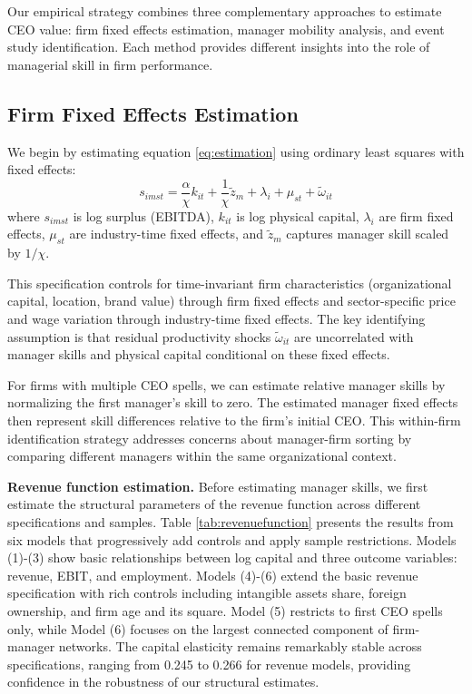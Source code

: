 \documentclass[11pt,a4paper]{article}
\begin{document}
Our empirical strategy combines three complementary approaches to estimate CEO value: firm fixed effects estimation, manager mobility analysis, and event study identification. Each method provides different insights into the role of managerial skill in firm performance.

\subsection{Firm Fixed Effects Estimation}

We begin by estimating equation \eqref{eq:estimation} using ordinary least squares with fixed effects:
\begin{equation}
s_{imst} = \frac{\alpha}{\chi} k_{it} + \frac{1}{\chi}\tilde{z}_m + \lambda_i + \mu_{st} + \tilde{\omega}_{it}
\end{equation}
where $s_{imst}$ is log surplus (EBITDA), $k_{it}$ is log physical capital, $\lambda_i$ are firm fixed effects, $\mu_{st}$ are industry-time fixed effects, and $\tilde{z}_m$ captures manager skill scaled by $1/\chi$.

This specification controls for time-invariant firm characteristics (organizational capital, location, brand value) through firm fixed effects and sector-specific price and wage variation through industry-time fixed effects. The key identifying assumption is that residual productivity shocks $\tilde{\omega}_{it}$ are uncorrelated with manager skills and physical capital conditional on these fixed effects.

For firms with multiple CEO spells, we can estimate relative manager skills by normalizing the first manager's skill to zero. The estimated manager fixed effects then represent skill differences relative to the firm's initial CEO. This within-firm identification strategy addresses concerns about manager-firm sorting by comparing different managers within the same organizational context.

\textbf{Revenue function estimation.} Before estimating manager skills, we first estimate the structural parameters of the revenue function across different specifications and samples. Table \ref{tab:revenuefunction} presents the results from six models that progressively add controls and apply sample restrictions. Models (1)-(3) show basic relationships between log capital and three outcome variables: revenue, EBIT, and employment. Models (4)-(6) extend the basic revenue specification with rich controls including intangible assets share, foreign ownership, and firm age and its square. Model (5) restricts to first CEO spells only, while Model (6) focuses on the largest connected component of firm-manager networks. The capital elasticity remains remarkably stable across specifications, ranging from 0.245 to 0.266 for revenue models, providing confidence in the robustness of our structural estimates.
\end{document}
